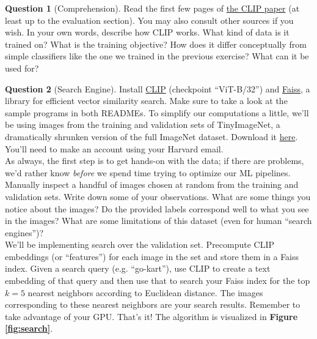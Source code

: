 \documentclass{article}
\theoremstyle{definition}
\newtheorem{subquestion}{Question}[question]
\begin{document}
\begin{subquestion}[Comprehension]
Read the first few pages of \href{https://arxiv.org/abs/2103.00020}{the CLIP paper} (at least up to the evaluation section). You may also consult other sources if you wish. In your own words, describe how CLIP works. What kind of data is it trained on? What is the training objective? How does it differ conceptually from simple classifiers like the one we trained in the previous exercise? What can it be used for?
\end{subquestion}

\begin{subquestion}[Search Engine] \label{ques:searchengine}
Install \href{https://github.com/openai/CLIP}{CLIP} (checkpoint ``ViT-B/32'') and \href{https://github.com/facebookresearch/faiss}{Faiss}, a library for efficient vector similarity search. Make sure to take a look at the sample programs in both READMEs. To simplify our computations a little, we'll be using images from the training and validation sets of TinyImageNet, a dramatically shrunken version of the full ImageNet dataset. Download it \href{https://www.image-net.org/}{here}. You'll need to make an account using your Harvard email. \\

As always, the first step is to get hands-on with the data; if there are problems, we'd rather know \textit{before} we spend time trying to optimize our ML pipelines. Manually inspect a handful of images chosen at random from the training and validation sets. Write down some of your observations. What are some things you notice about the images? Do the provided labels correspond well to what you see in the images? What are some limitations of this dataset (even for human ``search engines'')? \\

We'll be implementing search over the validation set. Precompute CLIP embeddings (or ``features'') for each image in the set and store them in a Faiss index. Given a search query (e.g. ``go-kart''), use CLIP to create a text embedding of that query and then use that to search your Faiss index for the top $k=5$ nearest neighbors according to Euclidean distance. The images corresponding to these nearest neighbors are your search results. Remember to take advantage of your GPU. That's it! The algorithm is visualized in \textbf{Figure \ref{fig:search}}.\\


\end{subquestion}
\end{document}
